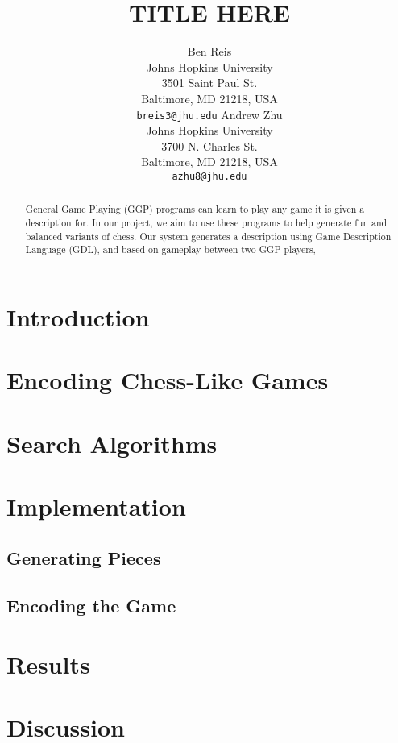 \documentclass[11pt,letterpaper]{article}
\title{TITLE HERE}
\author{Ben Reis \\
  Johns Hopkins University\\
  3501 Saint Paul St.\\
  Baltimore, MD 21218, USA\\
  {\tt breis3@jhu.edu}
  \And
  Andrew Zhu \\
  Johns Hopkins University \\
  3700 N. Charles St. \\
  Baltimore, MD 21218, USA\\
  {\tt azhu8@jhu.edu}}
\date{}
\begin{document}
\maketitle
\begin{abstract}
General Game Playing (GGP) programs can learn to play any game it is given a description for. In our project, we aim to use these programs to help generate fun and balanced variants of chess. Our system generates a description using Game Description Language (GDL), and based on gameplay between two GGP players,  
\end{abstract}

\section{Introduction}

\section{Encoding Chess-Like Games}

\section{Search Algorithms}

\section{Implementation}
\subsection{Generating Pieces}

\subsection{Encoding the Game}

\section{Results}

\section{Discussion}
\end{document}
